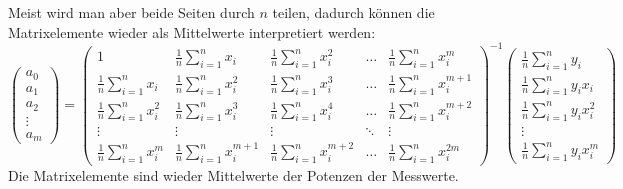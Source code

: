 Meist wird man aber beide Seiten durch $n$ teilen, dadurch können die
Matrixelemente wieder als Mittelwerte interpretiert werden:
\begin{equation}
\begin{pmatrix}
a_0\\
a_1\\
a_2\\
\vdots\\
a_m
\end{pmatrix}
=
\begin{pmatrix}
1
	&\frac1n\sum_{i=1}^nx_i
		&\frac1n\sum_{i=1}^nx_i^2
			&\dots
				&\frac1n\sum_{i=1}^nx_i^m\\
\frac1n\sum_{i=1}^nx_i
	&\frac1n\sum_{i=1}^nx_i^2
		&\frac1n\sum_{i=1}^nx_i^3
			&\dots
				&\frac1n\sum_{i=1}^nx_i^{m+1}\\
\frac1n\sum_{i=1}^nx_i^2
	&\frac1n\sum_{i=1}^nx_i^3
		&\frac1n\sum_{i=1}^nx_i^4
			&\dots
				&\frac1n\sum_{i=1}^nx_i^{m+2}\\
\vdots
	&\vdots
		&\vdots
			&\ddots
				&\vdots\\
\frac1n\sum_{i=1}^nx_i^m
	&\frac1n\sum_{i=1}^nx_i^{m+1}
		&\frac1n\sum_{i=1}^nx_i^{m+2}
			&\dots
				&\frac1n\sum_{i=1}^nx_i^{2m}
\end{pmatrix}^{-1}
\begin{pmatrix}
\frac1n\sum_{i=1}^ny_i     \\
\frac1n\sum_{i=1}^ny_ix_i  \\
\frac1n\sum_{i=1}^ny_ix_i^2\\
\vdots\\
\frac1n\sum_{i=1}^ny_ix_i^m
\end{pmatrix}
\label{polynomregression}
\end{equation}
Die Matrixelemente sind wieder Mittelwerte der Potenzen der Messwerte.

